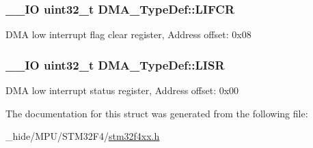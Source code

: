 \subsubsection[{L\+I\+F\+C\+R}]{\setlength{\rightskip}{0pt plus 5cm}\+\_\+\+\_\+\+I\+O uint32\+\_\+t D\+M\+A\+\_\+\+Type\+Def\+::\+L\+I\+F\+C\+R}\label{struct_d_m_a___type_def_a11adb689c874d38b49fa44990323b653}
D\+M\+A low interrupt flag clear register, Address offset\+: 0x08 \hypertarget{struct_d_m_a___type_def_aacb4a0977d281bc809cb5974e178bc2b}{}
\subsubsection[{L\+I\+S\+R}]{\setlength{\rightskip}{0pt plus 5cm}\+\_\+\+\_\+\+I\+O uint32\+\_\+t D\+M\+A\+\_\+\+Type\+Def\+::\+L\+I\+S\+R}\label{struct_d_m_a___type_def_aacb4a0977d281bc809cb5974e178bc2b}
D\+M\+A low interrupt status register, Address offset\+: 0x00 

The documentation for this struct was generated from the following file\+:\begin{DoxyCompactItemize}
\item 
\+\_\+hide/\+M\+P\+U/\+S\+T\+M32\+F4/\hyperlink{stm32f4xx_8h}{stm32f4xx.\+h}\end{DoxyCompactItemize}

